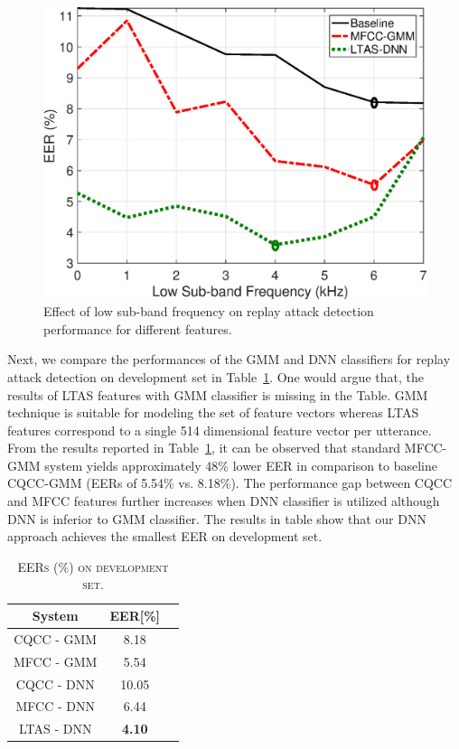 \documentclass{article}
\begin{document}
\begin{figure}[!t]
    \centering
    \includegraphics[scale=0.4]{./Images/eer-vs-fmin.eps}
    \caption{Effect of low sub-band frequency on replay attack detection performance for different features.}
    \label{eer_vs_fmin}
\end{figure}

Next, we compare the performances of the GMM and DNN classifiers for replay attack detection on development set in
Table~\ref{dev_res}. One would argue that, the results of LTAS features with GMM classifier is missing in the Table.
GMM technique is suitable for modeling the set of feature vectors whereas LTAS features correspond to a single 514
dimensional feature vector per utterance. From the results reported in Table~\ref{dev_res}, it can be observed that
standard MFCC-GMM system yields approximately 48\% lower EER in comparison to baseline CQCC-GMM (EERs of 5.54\% vs.
8.18\%). The performance gap between CQCC and MFCC features further increases when DNN classifier is utilized although
DNN is inferior to GMM classifier. The results in table show that our DNN approach achieves the smallest EER on
development set.

\begin{table}[!htb]
    \centering
    \caption{\textsc{EERs (\%) on development set.}}
    \vspace{4mm}
    \label{dev_res}
    \begin{tabular}{|c|c|c|}
        \hline
        System     & EER[\%]       \\ \hline
        CQCC - GMM & 8.18          \\
        MFCC - GMM & 5.54          \\
        CQCC - DNN & 10.05         \\
        MFCC - DNN & 6.44          \\
        LTAS - DNN & \textbf{4.10} \\
        \hline
    \end{tabular}
\end{table}
\end{document}
